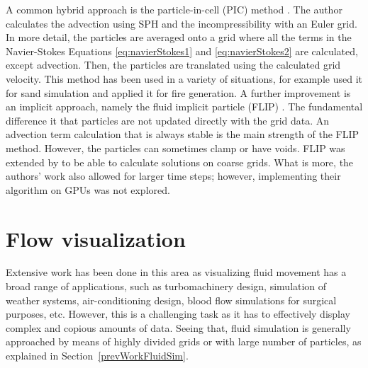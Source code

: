 A common hybrid approach is the particle-in-cell (PIC) method \cite{Harlow1962}.
The author calculates the advection using SPH and the incompressibility with an Euler grid.
In more detail, the particles are averaged onto a grid where all the terms in the Navier-Stokes Equations \ref{eq:navierStokes1} and \ref{eq:navierStokes2} are calculated, except advection.
Then, the particles are translated using the calculated grid velocity.
This method has been used in a variety of situations, for example \cite{Zhu2005} used it for sand simulation and \cite{Horvath2009} applied it for fire generation.
A further improvement is an implicit approach, namely the fluid implicit particle (FLIP) \cite{J.U.Brackbill1986}.
The fundamental difference it that particles are not updated directly with the grid data.
An advection term calculation that is always stable is the main strength of the FLIP method.
However, the particles can sometimes clamp or have voids.
FLIP was extended by \cite{Raveendran2011} to be able to calculate solutions on coarse grids.
What is more, the authors' work also allowed for larger time steps; however, implementing their algorithm on GPUs was not explored.

\section{Flow visualization}
\label{sec:flowVisualization}


Extensive work has been done in this area as visualizing fluid movement has a broad range of applications, such as turbomachinery design, simulation of weather systems, air-conditioning design, blood flow simulations for surgical purposes, etc.
However, this is a challenging task as it has to effectively display complex and copious amounts of data.
Seeing that, fluid simulation is generally approached by means of highly divided grids or with large number of particles, as explained in Section~\ref{prevWorkFluidSim}.

